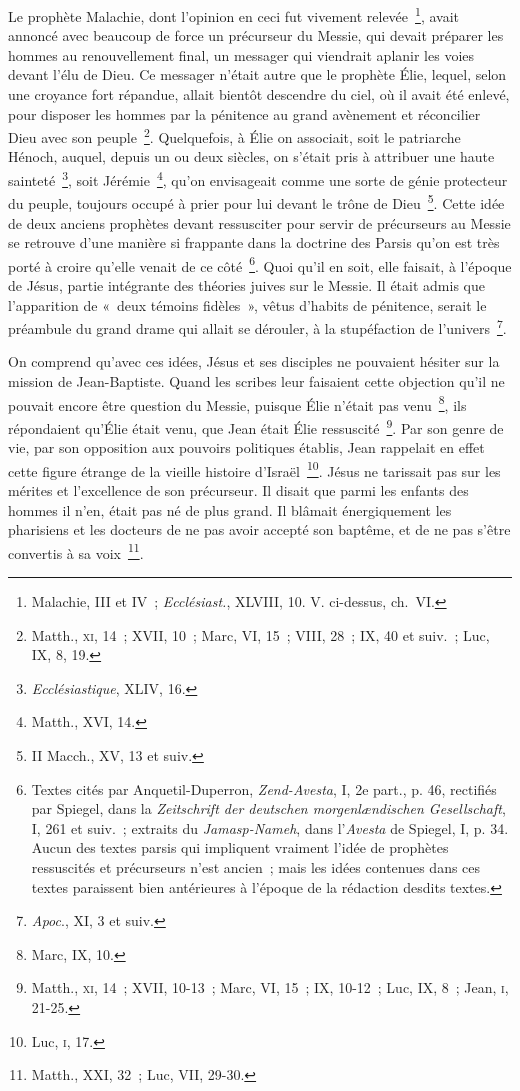 \documentclass[french,twoside]{book} %
\begin{document}
Le prophète Malachie, dont l’opinion en ceci fut vivement relevée \footnote{ Malachie, III et IV ; {\itshape Ecclésiast.}, XLVIII, 10. V. ci-dessus, ch. VI.}, avait annoncé avec beaucoup de force un précurseur du Messie, qui devait préparer les hommes au renouvellement final, un messager qui viendrait aplanir les voies devant l’élu de Dieu. Ce messager n’était autre que le prophète Élie, lequel, selon une croyance fort répandue, allait bientôt descendre du ciel, où il avait été enlevé, pour disposer les hommes par la pénitence au grand avènement et réconcilier Dieu avec son peuple \footnote{ Matth., \textsc{xi}, 14 ; XVII, 10 ; Marc, VI, 15 ; VIII, 28 ; IX, 40 et suiv. ; Luc, IX, 8, 19.}. Quelquefois, à Élie on associait, soit le patriarche Hénoch, auquel, depuis un ou deux siècles, on s’était pris à attribuer une haute sainteté \footnote{{\itshape Ecclésiastique}, XLIV, 16.}, soit Jérémie \footnote{Matth., XVI, 14.}, qu’on envisageait comme une sorte de génie protecteur du peuple, toujours occupé à prier pour lui devant le trône de Dieu \footnote{II Macch., XV, 13 et suiv.}. Cette idée de deux anciens prophètes devant ressusciter pour servir de précurseurs au Messie se retrouve d’une manière si frappante dans la doctrine des Parsis qu’on est très porté à croire qu’elle venait de ce côté \footnote{ Textes cités par Anquetil-Duperron, {\itshape Zend-Avesta}, I, 2e part., p. 46, rectifiés par Spiegel, dans la {\itshape Zeitschrift der deutschen morgenlændischen Gesellschaft}, I, 261 et suiv. ; extraits du {\itshape Jamasp-Nameh}, dans l’{\itshape Avesta} de Spiegel, I, p. 34. Aucun des textes parsis qui impliquent vraiment l’idée de prophètes ressuscités et précurseurs n’est ancien ; mais les idées contenues dans ces textes paraissent bien antérieures à l’époque de la rédaction desdits textes.}. Quoi qu’il en soit, elle faisait, à l’époque de Jésus, partie intégrante des théories juives sur le Messie. Il était admis que l’apparition de « deux témoins fidèles », vêtus d’habits de pénitence, serait le préambule du grand drame qui allait se dérouler, à la stupéfaction de l’univers \footnote{{\itshape Apoc}., XI, 3 et suiv.}.\par
On comprend qu’avec ces idées, Jésus et ses disciples ne pouvaient hésiter sur la mission de Jean-Baptiste. Quand les scribes leur faisaient cette objection qu’il ne pouvait encore être question du Messie, puisque Élie n’était pas venu \footnote{Marc, IX, 10.}, ils répondaient qu’Élie était venu, que Jean était Élie ressuscité \footnote{ Matth., \textsc{xi}, 14 ; XVII, 10-13 ; Marc, VI, 15 ; IX, 10-12 ; Luc, IX, 8 ; Jean, \textsc{i}, 21-25.}. Par son genre de vie, par son opposition aux pouvoirs politiques établis, Jean rappelait en effet cette figure étrange de la vieille histoire d’Israël \footnote{ Luc, \textsc{i}, 17.}. Jésus ne tarissait pas sur les mérites et l’excellence de son précurseur. Il disait que parmi les enfants des hommes il n’en, était pas né de plus grand. Il blâmait énergiquement les pharisiens et les docteurs de ne pas avoir accepté son baptême, et de ne pas s’être convertis à sa voix \footnote{Matth., XXI, 32 ; Luc, VII, 29-30.}.\par
\end{document}
